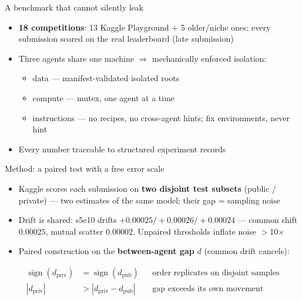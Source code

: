\documentclass[aspectratio=169,11pt]{beamer}
\begin{document}
\begin{frame}{A benchmark that cannot silently leak}
  \begin{itemize}\itemsep=1.2ex
    \item \textbf{18 competitions}: 13 Kaggle Playground + 5 older/niche ones; every submission scored on the \alert{real leaderboard} (late submission)
    \item Three agents share one machine $\Rightarrow$ mechanically enforced isolation:
      \begin{itemize}\itemsep=0.8ex
        \item data --- manifest-validated isolated roots
        \item compute --- mutex, one agent at a time
        \item instructions --- no recipes, no cross-agent hints; fix environments, never hint
      \end{itemize}
    \item Every number traceable to structured experiment records
  \end{itemize}
\end{frame}

\begin{frame}{Method: a paired test with a free error scale}
  \begin{itemize}\itemsep=1ex
    \item Kaggle scores each submission on \textbf{two disjoint test subsets} (public / private) --- two estimates of the same model; their gap = sampling noise
    \item Drift is \alert{shared}: s5e10 drifts $+0.00025/+0.00026/+0.00024$ --- common shift $0.00025$, mutual scatter $\mathbf{0.00002}$. Unpaired thresholds inflate noise $>$10$\times$
    \item Paired construction on the \textbf{between-agent gap} $d$ (common drift cancels):
  \end{itemize}
  \begin{align*}
    \operatorname{sign}(d_{\text{priv}}) &= \operatorname{sign}(d_{\text{pub}})
      && \text{order replicates on disjoint samples} \\
    |d_{\text{priv}}| &> |d_{\text{priv}} - d_{\text{pub}}|
      && \text{gap exceeds its own movement}
  \end{align*}
\end{frame}
\end{document}
